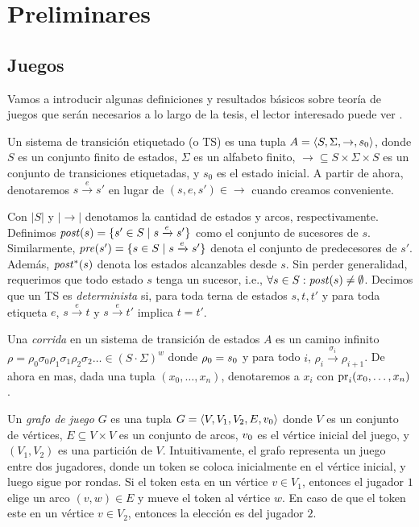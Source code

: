 \chapter{Preliminares}
\label{cap:preliminares}
\section{Juegos}

Vamos a introducir algunas definiciones y resultados básicos sobre teoría de juegos que serán necesarios a lo largo de la tesis, el lector interesado puede ver \cite{AptG11}.

Un sistema de transición etiquetado (o TS) es una tupla $A =\langle S, \Sigma, \rightarrow, s_0 \rangle$, donde $S$ es un conjunto finito de estados, $\Sigma$ es un alfabeto finito,  $\rightarrow \subseteq S \times \Sigma \times S$ es un conjunto de transiciones etiquetadas, y $s_0$ es el estado inicial. A partir de ahora, denotaremos $s \xrightarrow{e} s'$ en lugar de $(s,e,s') \in \rightarrow$ cuando creamos conveniente.

Con $|S|$ y $|{\rightarrow}|$ denotamos la cantidad de estados y arcos, respectivamente. Definimos $\mathit{post}(s) = \{s' \in S \mid s \xrightarrow{e} s' \}$ como el conjunto de sucesores de $s$. Similarmente,  $\mathit{pre}(s') = \{s \in S \mid s \xrightarrow{e} s' \}$ denota el conjunto de predecesores de $s'$.
Además, $\mathit{post}^{*}(s)$ denota los estados alcanzables desde $s$.
Sin perder generalidad, requerimos que todo estado $s$ tenga un sucesor, i.e., $\forall s \in S : \mathit{post}(s) \neq \emptyset$. Decimos que un TS es \emph{determinista} si, para toda terna de estados  $s,t, t'$ y para toda etiqueta $e$, $s \xrightarrow{e} t$ y $s \xrightarrow{e} t'$ implica $t=t'$. 

Una \emph{corrida} en un sistema de transición de estados $A$ es un camino infinito $\rho = \rho_0 \sigma_0 \rho_1 \sigma_1  \rho_2 \sigma_2 \dots \in (S \cdot \Sigma)^{w}$ 
donde $\rho_0 = s_0$ y para todo $i$, $\rho_i \xrightarrow{\sigma_i} \rho_{i+1}$. De ahora en mas, dada una tupla $(x_0,\dots,x_n)$, denotaremos a $x_i$ con  $\operatorname{pr}_{i}(x_0,\dots,x_n)$.

Un \emph{grafo de juego} $G$ es una tupla $G = \langle V, V_1, V_2, E, v_0 \rangle$ donde $V$ es un conjunto de vértices, $E\subseteq V \times V$ es un conjunto de arcos, $v_0$ es el vértice inicial del juego, y $(V_1, V_2)$ es una partición de $V$. Intuitivamente, el grafo representa un juego entre dos jugadores, donde un token se coloca inicialmente en el vértice inicial, y luego sigue por rondas. Si el token esta en un vértice $v \in V_1$, entonces el jugador $1$ elige un arco $(v, w) \in E$ y mueve el token al vértice $w$. En caso de que el token este en un vértice $v \in V_2$, entonces la elección es del jugador $2$.

